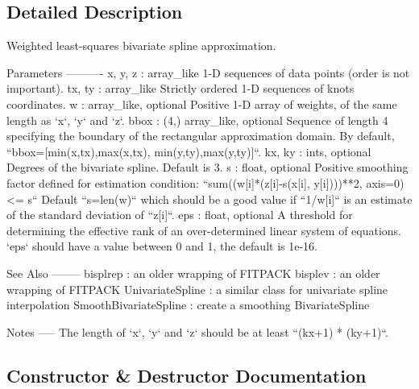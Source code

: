 \subsection{Detailed Description}
\begin{DoxyVerb}Weighted least-squares bivariate spline approximation.

Parameters
----------
x, y, z : array_like
    1-D sequences of data points (order is not important).
tx, ty : array_like
    Strictly ordered 1-D sequences of knots coordinates.
w : array_like, optional
    Positive 1-D array of weights, of the same length as `x`, `y` and `z`.
bbox : (4,) array_like, optional
    Sequence of length 4 specifying the boundary of the rectangular
    approximation domain.  By default,
    ``bbox=[min(x,tx),max(x,tx), min(y,ty),max(y,ty)]``.
kx, ky : ints, optional
    Degrees of the bivariate spline. Default is 3.
s : float, optional
    Positive smoothing factor defined for estimation condition:
    ``sum((w[i]*(z[i]-s(x[i], y[i])))**2, axis=0) <= s``
    Default ``s=len(w)`` which should be a good value if ``1/w[i]`` is an
    estimate of the standard deviation of ``z[i]``.
eps : float, optional
    A threshold for determining the effective rank of an over-determined
    linear system of equations. `eps` should have a value between 0 and 1,
    the default is 1e-16.

See Also
--------
bisplrep : an older wrapping of FITPACK
bisplev : an older wrapping of FITPACK
UnivariateSpline : a similar class for univariate spline interpolation
SmoothBivariateSpline : create a smoothing BivariateSpline

Notes
-----
The length of `x`, `y` and `z` should be at least ``(kx+1) * (ky+1)``.\end{DoxyVerb}
 

\subsection{Constructor \& Destructor Documentation}
\hypertarget{classscipy_1_1interpolate_1_1fitpack2_1_1LSQBivariateSpline_a66351f8e7826a1bbcec1b9901bcd5e7f}{}
